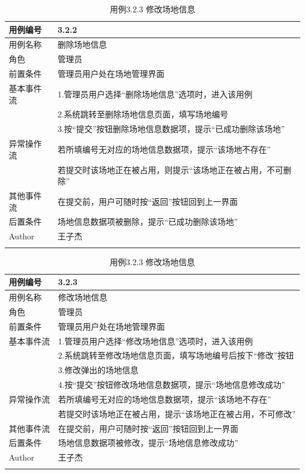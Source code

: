 \documentclass[a4paper,UTF8]{article}
\begin{document}
\begin{table}[H]
	\begin{center}
		\caption{用例3.2.2 删除场地信息}
		\label{table:Tab_uc322}
		\begin{tabular}{|p{}|p{}|}
			\hline\noalign{\smallskip}
			用例编号 & 3.2.2\\
			\hline
			用例名称 &  删除场地信息\\
			\hline
			角色 & 管理员\\
			\hline
			前置条件 & 管理员用户处在场地管理界面 \\
			\hline
			基本事件流 & 1.管理员用户选择“删除场地信息”选项时，进入该用例 \\& 2.系统跳转至删除场地信息页面，填写场地编号 \\& 3.按“提交”按钮删除场地信息数据项，提示“已成功删除该场地” \\
			\hline
			异常操作流 & 若所填编号无对应的场地信息数据项，提示“该场地不存在” \\& 若提交时该场地正在被占用，则提示“该场地正在被占用，不可删除” \\
			\hline
			其他事件流 & 在提交前，用户可随时按“返回”按钮回到上一界面 \\
			\hline
			后置条件 & 场地信息数据项被删除，提示“已成功删除该场地”  \\
			\hline
			Author & 王子杰 \\
			\noalign{\smallskip}
			\hline
			\noalign{\smallskip}
		\end{tabular}
		\caption{用例3.2.3 修改场地信息}
		\label{table:Tab_uc323}
		\begin{tabular}{|p{}|p{}|}
			\hline\noalign{\smallskip}
			用例编号 & 3.2.3\\
			\hline
			用例名称 &  修改场地信息\\
			\hline
			角色 & 管理员\\
			\hline
			前置条件 & 管理员用户处在场地管理界面 \\
			\hline
			基本事件流 & 1.管理员用户选择“修改场地信息”选项时，进入该用例 \\& 2.系统跳转至修改场地信息页面，填写场地编号后按下“修改”按钮 \\& 3.修改弹出的场地信息 \\& 4.按“提交”按钮修改场地信息数据项，提示“场地信息修改成功” \\
			\hline
			异常操作流 & 若所填编号无对应的场地信息数据项，提示“该场地不存在” \\& 若提交时该场地正在被占用，提示“该场地正在被占用，不可修改”\\
			\hline
			其他事件流 & 在提交前，用户可随时按“返回”按钮回到上一界面 \\
			\hline
			后置条件 & 场地信息数据项被修改，提示“场地信息修改成功”  \\
			\hline
			Author & 王子杰 \\
			\noalign{\smallskip}
			\hline
			\noalign{\smallskip}
		\end{tabular}
	\end{center}
\end{table}
\end{document}
